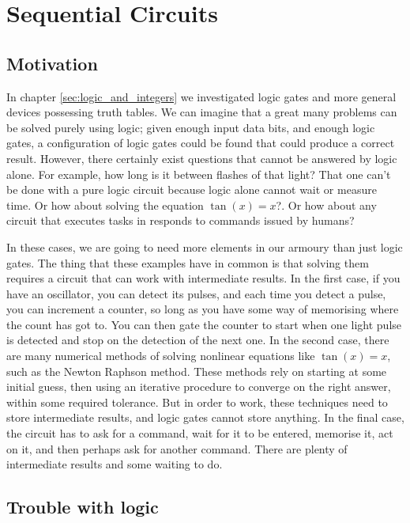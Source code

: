 \documentclass[../physical_computing.tex]{subfiles}
\begin{document}
\chapter{Sequential Circuits}
\label{sec:registers}

\section{Motivation}
\label{sec:motivate_sequential}

In chapter \ref{sec:logic_and_integers} we investigated logic gates
and more general devices possessing truth tables. We can imagine 
that a great many problems can be solved purely using logic; given enough input data bits, and enough logic gates, a configuration of 
logic gates could be found that could produce a correct result. 
However, there certainly exist questions that cannot be answered by logic alone. For example, how long is it between flashes of that 
light? That one can't be done with a pure logic circuit because logic alone cannot wait or measure time. Or how about solving the equation $\tan(x)=x$?. Or how about any circuit that executes tasks in
responds to commands issued by humans?

In these cases, we are going to need more elements in our armoury than just logic gates. The thing that these examples have in common is that solving them requires a circuit that can work with intermediate results. In the first case, if you have an oscillator, you can detect its pulses, and each time you detect a pulse, you can increment a counter, so long as you have some way of memorising where the count has got to. You can then gate the counter to start when one light pulse is detected and stop on the detection of the next one. In the second case, there are many numerical methods of solving nonlinear equations like $\tan(x)=x$, such as the Newton Raphson method. These methods rely on starting at some initial guess, then using an iterative procedure to converge on the right answer, within some required tolerance. But in order to work, these techniques need to store intermediate results, and logic gates cannot store anything. In the final
case, the circuit has to ask for a command, wait for it to be entered, memorise it, act on it, and then perhaps ask for another command. There are plenty of intermediate results and some waiting to do.

\section{Trouble with logic}
\label{sec:trouble}
\end{document}

